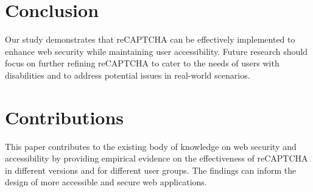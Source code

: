 \documentclass{article}
\begin{document}
\section{Conclusion}
Our study demonstrates that reCAPTCHA can be effectively implemented to enhance web security while maintaining user accessibility. Future research should focus on further refining reCAPTCHA to cater to the needs of users with disabilities and to address potential issues in real-world scenarios.

\section{Contributions}
This paper contributes to the existing body of knowledge on web security and accessibility by providing empirical evidence on the effectiveness of reCAPTCHA in different versions and for different user groups. The findings can inform the design of more accessible and secure web applications.



\end{document}

